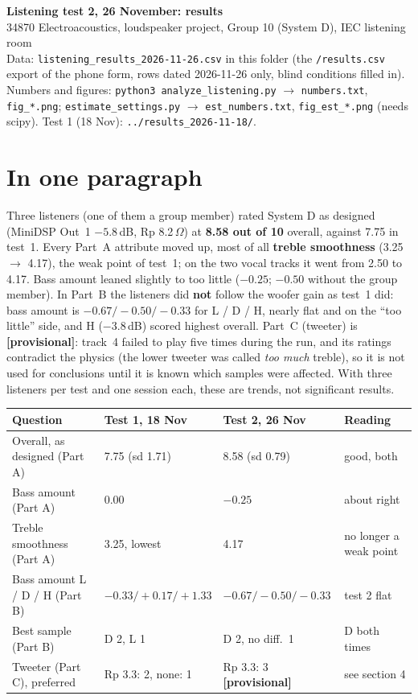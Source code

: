 \documentclass[11pt,a4paper]{article}
\newcommand{\prov}{\textcolor{red!70!black}{\textbf{[provisional]}}}
\begin{document}
{\LARGE\bfseries Listening test 2, 26 November: results}\\[2pt]
{\large 34870 Electroacoustics, loudspeaker project, Group 10 (System D), IEC listening room}\\[2pt]
{\small Data: \texttt{listening\_results\_2026-11-26.csv} in this folder (the \texttt{/results.csv} export of the
phone form, rows dated 2026-11-26 only, blind conditions filled in). Numbers and figures:
\texttt{python3 analyze\_listening.py} $\rightarrow$ \texttt{numbers.txt}, \texttt{fig\_*.png};
\texttt{estimate\_settings.py} $\rightarrow$ \texttt{est\_numbers.txt}, \texttt{fig\_est\_*.png} (needs scipy).
Test 1 (18 Nov): \texttt{../results\_2026-11-18/}.}

\section*{In one paragraph}
Three listeners (one of them a group member) rated System D as designed (MiniDSP Out~1 $-5.8$\,dB, Rp
8.2\,$\Omega$) at \textbf{8.58 out of 10} overall, against 7.75 in test~1. Every Part~A attribute moved up,
most of all \textbf{treble smoothness} (3.25 $\rightarrow$ 4.17), the weak point of test~1; on the two vocal
tracks it went from 2.50 to 4.17. Bass amount leaned slightly to too little ($-0.25$; $-0.50$ without the
group member). In Part~B the listeners did \textbf{not} follow the woofer gain as test~1 did: bass amount is
$-0.67 / -0.50 / -0.33$ for L / D / H, nearly flat and on the ``too little'' side, and H ($-3.8$\,dB) scored
highest overall. Part~C (tweeter) is \prov: track~4 failed to play five times during the run, and its
ratings contradict the physics (the lower tweeter was called \emph{too much} treble), so it is not used for
conclusions until it is known which samples were affected. With three listeners per test and one session
each, these are trends, not significant results.

\begin{center}\small
\begin{tabular}{@{}>{\raggedright}p{5.0cm}>{\raggedright}p{3.6cm}>{\raggedright}p{3.6cm}>{\raggedright\arraybackslash}p{3.0cm}@{}}\toprule
Question & Test 1, 18 Nov & Test 2, 26 Nov & Reading\\\midrule
Overall, as designed (Part A) & 7.75 (sd 1.71) & 8.58 (sd 0.79) & good, both\\
Bass amount (Part A) & 0.00 & $-0.25$ & about right\\
Treble smoothness (Part A) & 3.25, lowest & 4.17 & no longer a weak point\\
Bass amount L / D / H (Part B) & $-0.33 / +0.17 / +1.33$ & $-0.67 / -0.50 / -0.33$ & test 2 flat\\
Best sample (Part B) & D 2, L 1 & D 2, no diff.\ 1 & D both times\\
Tweeter (Part C), preferred & Rp 3.3: 2, none: 1 & Rp 3.3: 3 \prov & see section 4\\\bottomrule
\end{tabular}
\end{center}
\end{document}
